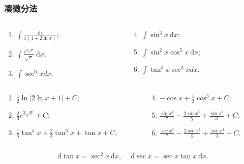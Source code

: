 \documentclass[
10pt,
aspectratio=43,
]{beamer}
\begin{document}
\begin{frame}
	\frametitle{凑微分法}
	\everymath{\displaystyle}
	\begin{block}{}
		\begin{columns}[onlytextwidth]
			\begin{column}{0.5\textwidth}
				\begin{enumerate}
					\item $\int \frac{\mathrm{~d} x}{x(1+2 \ln x)}$;
					\item $\int \frac{e^{3 \sqrt{x}}}{\sqrt{x}} \mathrm{~d} x$;
					\item $\int \sec ^6 x d x$;
				\end{enumerate}
			\end{column}
			\begin{column}{0.5\textwidth}
				\begin{enumerate}
					\setcounter{enumi}{3}
					\item $\int \sin ^3 x \mathrm{~d} x$;
					\item $\int \sin ^2 x \cos ^5 x \mathrm{~d} x$;
					\item $\int \tan ^5 x \sec ^3 x d x$.
				\end{enumerate}
			\end{column}
		\end{columns}
	\end{block}
	\pause
	\begin{exampleblock}{}
		\begin{columns}[onlytextwidth]
			\begin{column}{0.5\textwidth}
				\begin{enumerate}
					\item $\frac12\ln\left|2\ln x+1\right|+C$;
					      \pause
					\item $\frac{2}{3}e^{3\sqrt{x}}+C$;
					      \pause
					\item $\frac15\tan^5x+\frac23\tan^3x+\tan x+C$;
				\end{enumerate}
			\end{column}
			\begin{column}{0.5\textwidth}
				\begin{enumerate}
					\setcounter{enumi}{3}
					\pause
					\item $-\cos x +\frac{1}{3}\cos^3 x+C$;
					      \pause
					\item $\frac{\sin x^7}{7}-\frac{2 \sin x^5}{5}+\frac{\sin x^3}{3}+C$;
					      \pause
					\item $\frac{\sec x^7}{7}-\frac{2 \sec x^5}{5}+\frac{\sec x^3}{3}+C$.
				\end{enumerate}
			\end{column}
		\end{columns}
	\end{exampleblock}
	$$
		\mathrm{~d}\tan x = \sec^2 x\mathrm{~d}x,\quad \mathrm{~d}\sec x = \sec x\tan x \mathrm{~d}x.
	$$
\end{frame}
\end{document}

